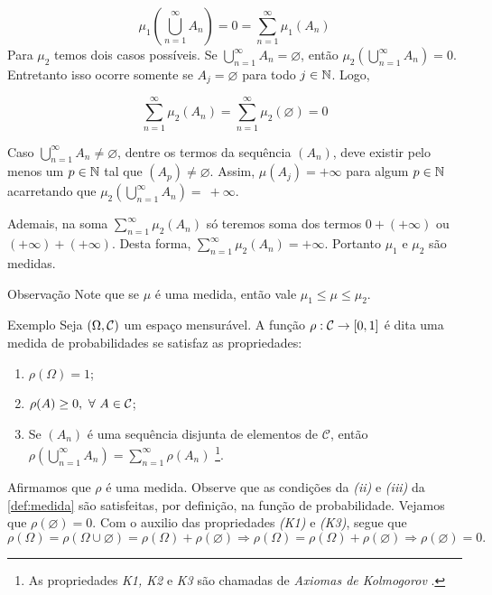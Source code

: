 $$\mu_1\left(\bigcup_{n = 1}^\infty A_n\right) = 0 = \sum_{n = 1}^\infty \mu_1(A_n) $$
Para $\mu_2$ temos dois casos possíveis.
Se  $\displaystyle \bigcup_{n = 1}^\infty A_n  = \varnothing$, então $\mu_2\left(\displaystyle \bigcup_{n = 1}^\infty A_n\right) = 0$. Entretanto isso ocorre somente se $A_j = \varnothing$ para todo $j \in \operatorname{\mathbb{N}}$.
Logo, 

$$\sum_{n = 1}^\infty \mu_2(A_n) = \sum_{n = 1}^\infty \mu_2(\varnothing) = 0$$

Caso $\displaystyle \bigcup_{n = 1}^\infty A_n  \neq  \varnothing$, dentre os termos da sequência $(A_n)$, deve existir pelo menos um $p \in \operatorname{\mathbb{N}}$ tal que $(A_p) \neq \varnothing$.
Assim, $\mu(A_j) = +\infty$ para algum $p \in \operatorname{\mathbb{N}}$ acarretando que  $\mu_2\left(\displaystyle \bigcup_{n = 1}^\infty A_n\right) =~+\infty$.

Ademais, na soma $\displaystyle \sum_{n = 1}^\infty \mu_2(A_n)$ só teremos soma dos termos $0 + (+ \infty)$ ou $(+\infty) + (+\infty)$.
Desta forma, $\displaystyle \sum_{n = 1}^\infty \mu_2(A_n) = +\infty$.
Portanto $\mu_1$ e $\mu_2$ são medidas.

\begin{env}{Observação}
	Note que se $\mu$ é uma medida, então vale $\mu_1\leq \mu \leq \mu_2$.
\end{env}

\begin{env}{Exemplo}
	Seja $(\Omega, \operatorname{\mathcal{C}})$ um espaço mensurável.
	A função $\rho:\operatorname{\mathcal{C}} \to [0,1]$ é dita uma medida de probabilidades se satisfaz as propriedades:
	\begin{enumerate}[label* =(\textit{K\arabic*})]
		\item $\rho(\Omega) = 1$;
		\item $\rho(A) \geq 0,\ \forall\  A \in \operatorname{\mathcal{C}}$;
		\item Se $(A_n)$ é uma sequência disjunta de elementos de  $\mathcal{C}$, então 
		$\displaystyle
		\rho\left(\bigcup_{n = 1}^\infty A_n\right) 
		= 
		\sum_{n = 1}^\infty\rho(A_n)
		$
		\footnote{
			As propriedades \textit{K1, K2} e \textit{K3} são chamadas de \textit{Axiomas de Kolmogorov} \cite{magalhares}.
		}.
	\end{enumerate}
\end{env}

Afirmamos que $\rho$ é uma medida.
Observe que as condições da \textit{(ii)} e \textit{(iii)} da \ref{def:medida} são satisfeitas, por definição, na função de probabilidade.
Vejamos que $\rho(\varnothing) = 0$.
Com o auxilio das propriedades \textit{(K1)} e \textit{(K3)}, segue que 
$$
\rho(\Omega)
= 
\rho(\Omega \cup \varnothing)
= 
\rho(\Omega) + \rho(\varnothing)
\Rightarrow
\rho(\Omega)
= 
\rho(\Omega) + \rho(\varnothing)
\Rightarrow
\rho(\varnothing) = 0.
$$

